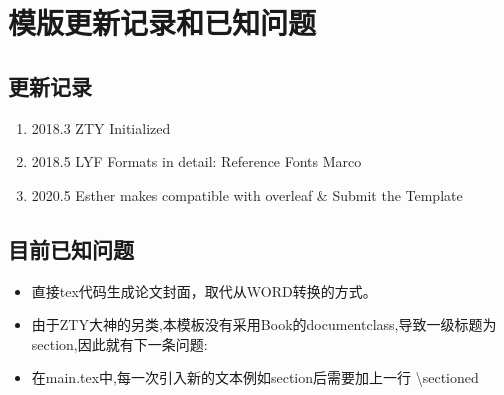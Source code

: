 
\section{模版更新记录和已知问题}
\subsection{更新记录}
\begin{enumerate}
    \item 2018.3 ZTY Initialized
    \item 2018.5 LYF Formats in detail: Reference Fonts Marco
    \item 2020.5 Esther makes compatible with overleaf \& Submit the Template 
\end{enumerate}
\subsection{目前已知问题}
\begin{itemize}
\item 直接tex代码生成论文封面，取代从WORD转换的方式。
\item 由于ZTY大神的另类,本模板没有采用Book的documentclass,导致一级标题为section,因此就有下一条问题:
\item 在main.tex中,每一次引入新的文本例如section后需要加上一行 \textbackslash sectioned

\end{itemize}